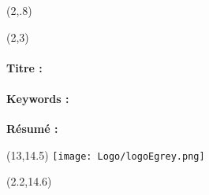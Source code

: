 \begin{textblock}{10}(2,.8)
\logoED
\end{textblock}


\begin{textblock}{13}(2,3)
\paragraph{Titre : \PhDTitleFR} 
\paragraph{Keywords : }\PhDkeywordsFR  \bigskip

\textbf{R\'esum\'e :} \PhDsumFR 
\end{textblock}


\begin{textblock}{13}(13,14.5)
\texttt{[image: Logo/logoEgrey.png]}
\end{textblock}
\parindent=0pt 



\begin{textblock}{10}(2.2,14.6)

\end{textblock}









